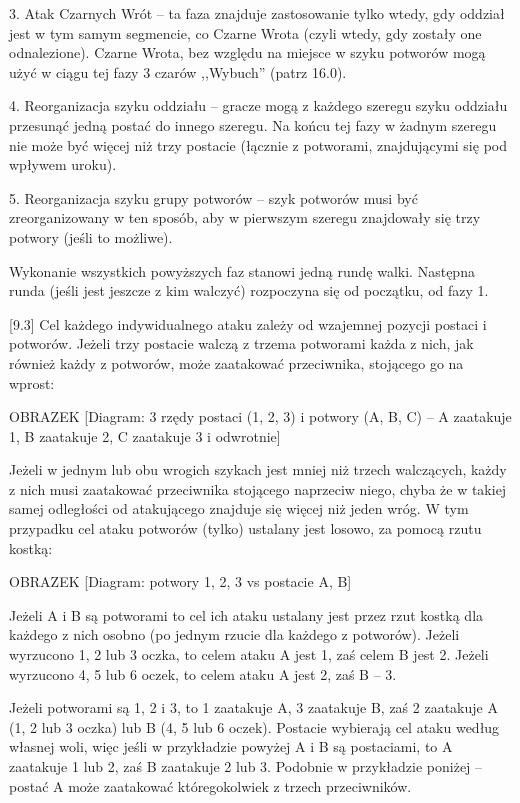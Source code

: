 3.
Atak Czarnych Wrót – ta faza znajduje zastosowanie tylko wtedy, gdy oddział jest w tym samym segmencie, co Czarne Wrota (czyli wtedy, gdy zostały one odnalezione).
Czarne Wrota, bez względu na miejsce w szyku potworów mogą użyć w ciągu tej fazy 3 czarów ,,Wybuch'' (patrz 16.0).

4.
Reorganizacja szyku oddziału – gracze mogą z każdego szeregu szyku oddziału przesunąć jedną postać do innego szeregu.
Na końcu tej fazy w żadnym szeregu nie może być więcej niż trzy postacie (łącznie z potworami, znajdującymi się pod wpływem uroku).

5.
Reorganizacja szyku grupy potworów – szyk potworów musi być zreorganizowany w ten sposób, aby w pierwszym szeregu znajdowały się trzy potwory (jeśli to możliwe).

Wykonanie wszystkich powyższych faz stanowi jedną rundę walki.
Następna runda (jeśli jest jeszcze z kim walczyć) rozpoczyna się od początku, od fazy 1.

[9.3] Cel każdego indywidualnego ataku zależy od wzajemnej pozycji postaci i potworów.
Jeżeli trzy postacie walczą z trzema potworami każda z nich, jak również każdy z potworów, może zaatakować przeciwnika, stojącego go na wprost:

OBRAZEK
[Diagram: 3 rzędy postaci (1, 2, 3) i potwory (A, B, C) – A zaatakuje 1, B zaatakuje 2, C zaatakuje 3 i odwrotnie]

Jeżeli w jednym lub obu wrogich szykach jest mniej niż trzech walczących, każdy z nich musi zaatakować przeciwnika stojącego naprzeciw niego, chyba że w takiej samej odległości od atakującego znajduje się więcej niż jeden wróg.
W tym przypadku cel ataku potworów (tylko) ustalany jest losowo, za pomocą rzutu kostką:

OBRAZEK
[Diagram: potwory 1, 2, 3 vs postacie A, B]

Jeżeli A i B są potworami to cel ich ataku ustalany jest przez rzut kostką dla każdego z nich osobno (po jednym rzucie dla każdego z potworów).
Jeżeli wyrzucono 1, 2 lub 3 oczka, to celem ataku A jest 1, zaś celem B jest 2.
Jeżeli wyrzucono 4, 5 lub 6 oczek, to celem ataku A jest 2, zaś B – 3.

Jeżeli potworami są 1, 2 i 3, to 1 zaatakuje A, 3 zaatakuje B, zaś 2 zaatakuje A (1, 2 lub 3 oczka) lub B (4, 5 lub 6 oczek).
Postacie wybierają cel ataku według własnej woli, więc jeśli w przykładzie powyżej A i B są postaciami, to A zaatakuje 1 lub 2, zaś B zaatakuje 2 lub 3.
Podobnie w przykładzie poniżej – postać A może zaatakować któregokolwiek z trzech przeciwników.

